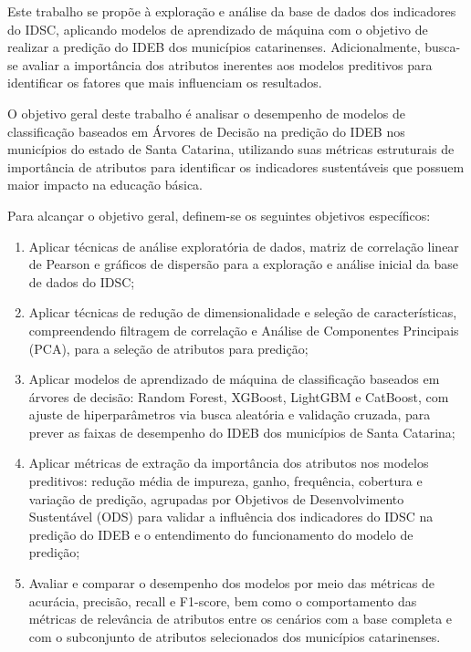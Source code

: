 Este trabalho se propõe à exploração e análise da base de dados dos indicadores do IDSC, aplicando modelos de aprendizado de máquina com o objetivo de realizar a predição do IDEB dos municípios catarinenses. Adicionalmente, busca-se avaliar a importância dos atributos inerentes aos modelos preditivos para identificar os fatores que mais influenciam os resultados.

O objetivo geral deste trabalho é analisar o desempenho de modelos de classificação baseados em Árvores de Decisão na predição do IDEB nos municípios do estado de Santa Catarina, utilizando suas métricas estruturais de importância de atributos para identificar os indicadores sustentáveis que possuem maior impacto na educação básica.

Para alcançar o objetivo geral, definem-se os seguintes objetivos específicos:
\begin{enumerate}
	\item Aplicar técnicas de análise exploratória de dados, matriz de correlação linear de Pearson e gráficos de dispersão para a exploração e análise inicial da base de dados do IDSC;
	
	\item Aplicar técnicas de redução de dimensionalidade e seleção de características, compreendendo filtragem de correlação e Análise de Componentes Principais (PCA), para a seleção de atributos para predição;
	
	\item Aplicar modelos de aprendizado de máquina de classificação baseados em árvores de decisão: Random Forest, XGBoost, LightGBM e CatBoost, com ajuste de hiperparâmetros via busca aleatória e validação cruzada, para prever as faixas de desempenho do IDEB dos municípios de Santa Catarina;
	
	\item Aplicar métricas de extração da importância dos atributos nos modelos preditivos: redução média de impureza, ganho, frequência, cobertura e variação de predição, agrupadas por Objetivos de Desenvolvimento Sustentável (ODS) para validar a influência dos indicadores do IDSC na predição do IDEB e o entendimento do funcionamento do modelo de predição;
	
	\item Avaliar e comparar o desempenho dos modelos por meio das métricas de acurácia, precisão, recall e F1-score, bem como o comportamento das métricas de relevância de atributos entre os cenários com a base completa e com o subconjunto de atributos selecionados dos municípios catarinenses.
\end{enumerate}

